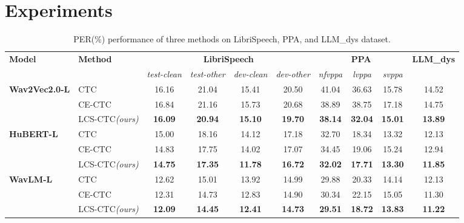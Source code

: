 \section{Experiments}

\begin{table}[ht]
\centering
\begin{tabular}{l|l|cccc|ccc|c}
\toprule
\multirow{2}{*}{\textbf{Model}} & \multirow{2}{*}{\textbf{Method}} & \multicolumn{4}{c|}{\textbf{LibriSpeech}} & \multicolumn{3}{c|}{\textbf{PPA}} &\multirow{2}{*}{\textbf{LLM\_dys}}\\
& & \textit{test-clean} & \textit{test-other} & \textit{dev-clean} & \textit{dev-other} & \textit{nfvppa} & \textit{lvppa} & \textit{svppa} & \\
\midrule
\multirow{3}{*}{\textbf{Wav2Vec2.0-L}} 
& CTC      & 16.16 & 21.04 & 15.41 & 20.50 & 41.04 & 36.63 & 15.78 & 14.52 \\
& CE-CTC   & 16.84 & 21.16 & 15.73 & 20.68 & 38.89 & 38.75 & 17.18 & 14.75 \\
& LCS-CTC\textit{(ours)}  & \textbf{16.09} & \textbf{20.94} & \textbf{15.10} & \textbf{19.70} & \textbf{38.14} & \textbf{32.04} & \textbf{15.01} & \textbf{13.89} \\
\midrule
\multirow{3}{*}{\textbf{HuBERT-L }} 
& CTC      & 15.00 & 18.16 & 14.12 & 17.18 & 32.70 & 18.34 & 13.32 & 12.13 \\
& CE-CTC   & 14.83 & 17.75 & 14.02 & 17.07 & 34.45 & 19.06 & 15.24 & 12.94 \\
& LCS-CTC\textit{(ours)}  & \textbf{14.75} & \textbf{17.35} & \textbf{11.78} & \textbf{16.72} & \textbf{32.02} & \textbf{17.71} & \textbf{13.30} & \textbf{11.85} \\
\midrule
\multirow{3}{*}{\textbf{WavLM-L}} 
& CTC      & 12.62 & 15.01 & 13.92 & 14.99 & 29.88 & 20.33 & 14.14 & 12.13 \\
& CE-CTC   & 12.31 & 14.73 & 12.83 & 14.90 & 30.34 & 22.15 & 15.05 & 11.30 \\
& LCS-CTC\textit{(ours)}  & \textbf{12.09} & \textbf{14.45} & \textbf{12.41} & \textbf{14.73} & \textbf{29.51} & \textbf{18.72} & \textbf{13.83} & \textbf{11.22} \\
\bottomrule
\end{tabular}
\caption{PER(\%) performance of three methods on LibriSpeech, PPA, and LLM\_dys dataset.}
\label{tab:per-results}
 \vspace{-5pt}
\end{table}
